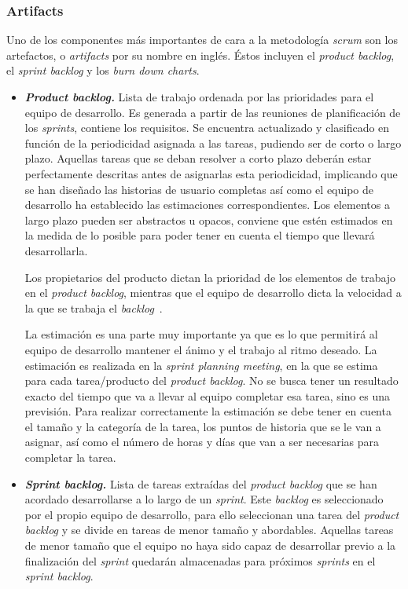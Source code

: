 \subsubsection{Artifacts}
Uno de los componentes más importantes de cara a la metodología \textit{scrum} son los artefactos, o \textit{artifacts} por su nombre en inglés. Éstos incluyen el \textit{product backlog}, el \textit{sprint backlog} y los \textit{burn down charts}.
\begin{itemize}
\item \textbf{\textit{Product backlog.}} Lista de trabajo ordenada por las prioridades para el equipo de desarrollo. Es generada a partir de las reuniones de planificación de los \textit{sprints}, contiene los requisitos. Se encuentra actualizado y clasificado en función de la periodicidad asignada a las tareas, pudiendo ser de corto o largo plazo. Aquellas tareas que se deban resolver a corto plazo deberán estar perfectamente descritas antes de asignarlas esta periodicidad, implicando que se han diseñado las historias de usuario completas así como el equipo de desarrollo ha establecido las estimaciones correspondientes. Los elementos a largo plazo pueden ser abstractos u opacos, conviene que estén estimados en la medida de lo posible para poder tener en cuenta el tiempo que llevará desarrollarla.

Los propietarios del producto dictan la prioridad de los elementos de trabajo en el \textit{product backlog}, mientras que el equipo de desarrollo dicta la velocidad a la que se trabaja el \textit{backlog}~\cite{danradigan2021}.

La estimación es una parte muy importante ya que es lo que permitirá al equipo de desarrollo mantener el ánimo y el trabajo al ritmo deseado. La estimación es realizada en la \textit{sprint planning meeting}, en la que se estima para cada tarea/producto del \textit{product backlog}. No se busca tener un resultado exacto del tiempo que va a llevar al equipo completar esa tarea, sino es una previsión. Para realizar correctamente la estimación se debe tener en cuenta el tamaño y la categoría de la tarea, los puntos de historia que se le van a asignar, así como el número de horas y días que van a ser necesarias para completar la tarea. 

\item \textbf{\textit{Sprint backlog.}} Lista de tareas extraídas del \textit{product backlog} que se han acordado desarrollarse a lo largo de un \textit{sprint}. Este \textit{backlog} es seleccionado por el propio equipo de desarrollo, para ello seleccionan una tarea del \textit{product backlog} y se divide en tareas de menor tamaño y abordables. Aquellas tareas de menor tamaño que el equipo no haya sido capaz de desarrollar previo a la finalización del \textit{sprint} quedarán almacenadas para próximos \textit{sprints} en el \textit{sprint backlog}.
\end{itemize}

